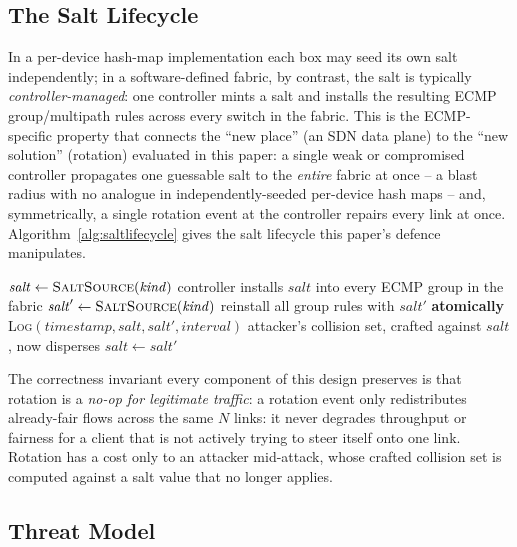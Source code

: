 \documentclass[conference]{IEEEtran}
\begin{document}
\subsection{The Salt Lifecycle}

In a per-device hash-map implementation each box may seed its own salt independently; in a software-defined
fabric, by contrast, the salt is typically \emph{controller-managed}: one controller mints a salt and installs
the resulting ECMP group/multipath rules across every switch in the fabric. This is the ECMP-specific property
that connects the ``new place'' (an SDN data plane) to the ``new solution'' (rotation) evaluated in this paper: a
single weak or compromised controller propagates one guessable salt to the \emph{entire} fabric at once -- a
blast radius with no analogue in independently-seeded per-device hash maps -- and, symmetrically, a single
rotation event at the controller repairs every link at once. Algorithm~\ref{alg:saltlifecycle} gives the salt
lifecycle this paper's defence manipulates.
\begin{algorithm}[t]
\caption{Salt lifecycle under rotation}
\label{alg:saltlifecycle}
\begin{algorithmic}[1]
\STATE $\mathit{salt} \leftarrow \textsc{SaltSource}(\mathit{kind})$ 
\STATE controller installs $\mathit{salt}$ into every ECMP group in the fabric
\LOOP {}
  \STATE $\mathit{salt}' \leftarrow \textsc{SaltSource}(\mathit{kind})$
  \STATE reinstall all group rules with $\mathit{salt}'$ \textbf{atomically}
  \STATE \textsc{Log}$(\mathit{timestamp}, \mathit{salt}, \mathit{salt}', \mathit{interval})$
  \STATE attacker's collision set, crafted against $\mathit{salt}$, now disperses
  \STATE $\mathit{salt} \leftarrow \mathit{salt}'$
\ENDLOOP
\end{algorithmic}
\end{algorithm}
The correctness invariant every component of this design preserves is that rotation is a \emph{no-op for
legitimate traffic}: a rotation event only redistributes already-fair flows across the same $N$ links: it never
degrades throughput or fairness for a client that is not actively trying to steer itself onto one link. Rotation
has a cost only to an attacker mid-attack, whose crafted collision set is computed against a salt value that no
longer applies.

\subsection{Threat Model}
\end{document}
